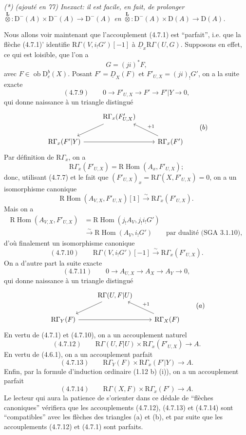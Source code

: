 \documentclass[11pt]{article}
\DeclareMathOperator{\Hom}{Hom}
\newcommand{\R}{\mathrm{R}}
\newcommand{\D}{\mathrm{D}}
\newcommand{\ob}{\operatorname{ob}}
\providecommand{\Hom}{\operatorname{Hom}}
\providecommand{\ob}{\operatorname{ob}}
\providecommand{\R}{\mathrm R}
\providecommand{\Hom}{\operatorname{Hom}}
\begin{document}
\emph{(*) (ajouté en 77) Inexact: il est facile, en fait, de prolonger $\overset{\mathbf L}{\otimes}:\D^-(A)\times\D^-(A)\to\D^-(A)$ en $\overset{\mathbf L}{\otimes}:\D^-(A)\times\D(A)\to\D(A)$.}

Nous allons voir maintenant que l'accouplement (4.7.1) est ``parfait'', i.e. que la flèche (4.7.1)' identifie $\R\Gamma(V,i_!G')[-1]$ à $\underline{D}_x\R\Gamma(U,G)$. Supposons en effet, ce qui est loisible, que l'on a
\[
G=(ji)^*F,
\]
avec $F\in\ob\D_c^b(X)$. Posant $F'=\underline{D}_X(F)$ et $F'_{U,X}=(ji)_!G'$, on a la suite exacte
\[
(4.7.9)\qquad 0\longrightarrow F'_{U,X}\longrightarrow F'\longrightarrow F'|Y\longrightarrow0,
\]
qui donne naissance à un triangle distingué
\[
\begin{tikzcd}
& \R\Gamma_x(F'_{U,X}) \arrow[dl] \\
\R\Gamma_x(F'|Y) \arrow[rr] && \R\Gamma_x(F') \arrow[ul,"{+1}"']
\end{tikzcd}
\qquad (b)
\]
Par définition de $\R\Gamma_x$, on a
\[
\R\Gamma_x(F'_{U,X})=\R\Hom(A_x,F'_{U,X});
\]
donc, utilisant (4.7.7) et le fait que $(F'_{U,X})_x=\R\Gamma(X,F'_{U,X})=0$, on a un isomorphisme canonique
\[
\R\Hom(A_{V,X},F'_{U,X})[1]\xrightarrow{\sim}\R\Gamma_x(F'_{U,X}).
\]
Mais on a
\[
\begin{aligned}
\R\Hom(A_{V,X},F'_{U,X})&=\R\Hom(j_!A_V,j_!i_!G')\\
&\xrightarrow{\sim}\R\Hom(A_V,i_!G')\qquad\text{par dualité (SGA~3.1.10)},
\end{aligned}
\]
d'où finalement un isomorphisme canonique
\[
(4.7.10)\qquad \R\Gamma(V,i_!G')[-1]\xrightarrow{\sim}\R\Gamma_x(F'_{U,X}).
\]
On a d'autre part la suite exacte
\[
(4.7.11)\qquad 0\longrightarrow A_{U,X}\longrightarrow A_X\longrightarrow A_Y\longrightarrow0,
\]
qui donne naissance à un triangle distingué
\[
\begin{tikzcd}
& \R\Gamma(U,F|U) \arrow[dl] \\
\R\Gamma_Y(F) \arrow[rr] && \R\Gamma_X(F) \arrow[ul,"{+1}"']
\end{tikzcd}
\qquad (a)
\]
En vertu de (4.7.1) et (4.7.10), on a un accouplement naturel
\[
(4.7.12)\qquad \R\Gamma(U,F|U)\times\R\Gamma_x(F'_{U,X})\longrightarrow A.
\]
En vertu de (4.6.1), on a un accouplement parfait
\[
(4.7.13)\qquad \R\Gamma_Y(F)\times\R\Gamma_x(F'|Y)\longrightarrow A.
\]
Enfin, par la formule d'induction ordinaire (1.12 b) (i)), on a un accouplement parfait
\[
(4.7.14)\qquad \R\Gamma(X,F)\times\R\Gamma_x(F')\longrightarrow A.
\]
Le lecteur qui aura la patience de s'orienter dans ce dédale de ``flèches canoniques'' vérifiera que les accouplements (4.7.12), (4.7.13) et (4.7.14) sont ``compatibles'' avec les flèches des triangles (a) et (b), et par suite que les accouplements (4.7.12) et (4.7.1) sont parfaits.
\end{document}
